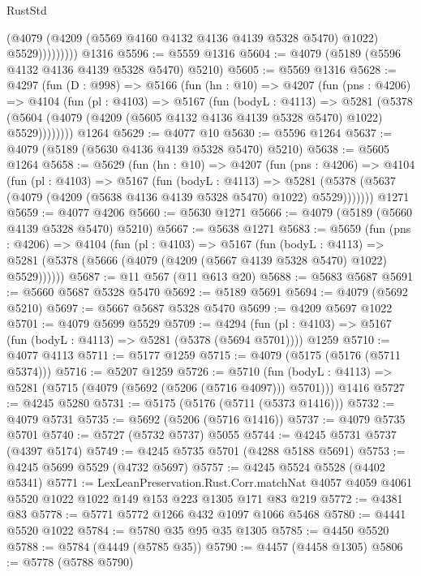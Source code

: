 \begin{lexlean}{RustStd}
\begin{coremodule}
{\begin{coremodule}
{{{{{{{{{{{{{{                    (@4079 (@4209 (@5569 @4160 @4132 @4136 @4139 @5328 @5470) @1022) @5529)))))))))
    @1316
@5596 := @5559 @1316
@5604 := @4079 (@5189 (@5596 @4132 @4136 @4139 @5328 @5470) @5210)
@5605 := @5569 @1316
@5628 := @4297
    (fun (D : @998) =>
    @5166
      (fun (hn : @10) =>
      @4207
        (fun (pns : @4206) =>
        @4104
          (fun (pl : @4103) =>
          @5167
            (fun (bodyL : @4113) =>
            @5281
              (@5378 (@5604 (@4079 (@4209 (@5605 @4132 @4136 @4139 @5328 @5470) @1022) @5529))))))))
    @1264
@5629 := @4077 @10
@5630 := @5596 @1264
@5637 := @4079 (@5189 (@5630 @4136 @4139 @5328 @5470) @5210)
@5638 := @5605 @1264
@5658 := @5629
    (fun (hn : @10) =>
    @4207
      (fun (pns : @4206) =>
      @4104
        (fun (pl : @4103) =>
        @5167
          (fun (bodyL : @4113) =>
          @5281 (@5378 (@5637 (@4079 (@4209 (@5638 @4136 @4139 @5328 @5470) @1022) @5529)))))))
    @1271
@5659 := @4077 @4206
@5660 := @5630 @1271
@5666 := @4079 (@5189 (@5660 @4139 @5328 @5470) @5210)
@5667 := @5638 @1271
@5683 := @5659
    (fun (pns : @4206) =>
    @4104
      (fun (pl : @4103) =>
      @5167
        (fun (bodyL : @4113) =>
        @5281 (@5378 (@5666 (@4079 (@4209 (@5667 @4139 @5328 @5470) @1022) @5529))))))
@5687 := @11 @567 (@11 @613 @20)
@5688 := @5683 @5687
@5691 := @5660 @5687 @5328 @5470
@5692 := @5189 @5691
@5694 := @4079 (@5692 @5210)
@5697 := @5667 @5687 @5328 @5470
@5699 := @4209 @5697 @1022
@5701 := @4079 @5699 @5529
@5709 := @4294
    (fun (pl : @4103) => @5167 (fun (bodyL : @4113) => @5281 (@5378 (@5694 @5701))))
    @1259
@5710 := @4077 @4113
@5711 := @5177 @1259
@5715 := @4079 (@5175 (@5176 (@5711 @5374)))
@5716 := @5207 @1259
@5726 := @5710
    (fun (bodyL : @4113) => @5281 (@5715 (@4079 (@5692 (@5206 (@5716 @4097))) @5701)))
    @1416
@5727 := @4245 @5280
@5731 := @5175 (@5176 (@5711 (@5373 @1416)))
@5732 := @4079 @5731
@5735 := @5692 (@5206 (@5716 @1416))
@5737 := @4079 @5735 @5701
@5740 := @5727 (@5732 @5737) @5055
@5744 := @4245 @5731 @5737 (@4397 @5174)
@5749 := @4245 @5735 @5701 (@4288 @5188 @5691)
@5753 := @4245 @5699 @5529 (@4732 @5697)
@5757 := @4245 @5524 @5528 (@4402 @5341)
@5771 := LexLeanPreservation.Rust.Corr.matchNat
    @4057
    @4059
    @4061
    @5520
    @1022
    @1022
    @149
    @153
    @223
    @1305
    @171
    @83
    @219
@5772 := @4381 @83
@5778 := @5771 @5772 @1266 @432 @1097 @1066 @5468
@5780 := @4441 @5520 @1022
@5784 := @5780 @35 @95 @35 @1305
@5785 := @4450 @5520
@5788 := @5784 (@4449 (@5785 @35))
@5790 := @4457 (@4458 @1305)
@5806 := @5778
    (@5788 @5790)
}}}}}}}}}}}}}}
\end{coremodule}}
\end{coremodule}
\end{lexlean}
